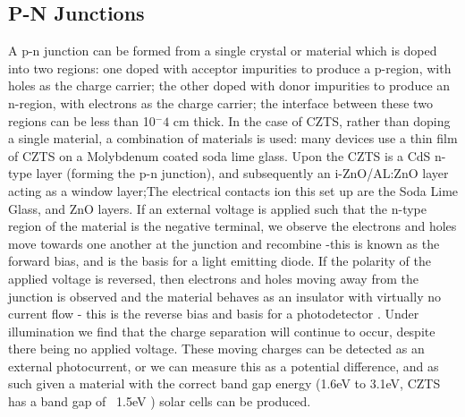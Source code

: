 \documentclass[11pt,a4paper,twoside]{article}
\begin{document}

\subsection{P-N Junctions}

A p-n junction can be formed from a single crystal or material which is doped into two regions: one doped with acceptor impurities to produce a p-region, with holes as the charge carrier; the other doped with donor impurities to produce an n-region, with electrons as the charge carrier; the interface between these two regions can be less than 10$^-4$ cm thick. \citep{Kittel2004} In the case of CZTS, rather than doping a single material, a combination of materials is used: many devices use a thin film of CZTS on a Molybdenum coated soda lime glass. Upon the CZTS is a CdS n-type layer (forming the p-n junction), and subsequently an i-ZnO/AL:ZnO layer acting as a window layer;The electrical contacts ion this set up are the Soda Lime Glass, and ZnO layers.\citep{Wang2011}
If an external voltage is applied such that the n-type region of the material is the negative terminal, we observe the electrons and holes move towards one another at the junction and recombine -this is  known as the forward bias, and is the basis for a light emitting diode.
If the polarity of the applied voltage is reversed, then electrons and holes moving away from the junction is observed and the material behaves as an insulator with virtually no current flow -  this is the reverse bias and basis for a photodetector \citep{Askeland2010}. Under illumination we find that the charge separation will continue to occur, despite there being no applied voltage. These moving charges can be detected as an external photocurrent, or we can measure this as a potential difference, and as such given a material with the correct band gap energy (1.6eV to 3.1eV, CZTS has a band gap of ~1.5eV \citep{JJAP.48.090202,Katagiri2001}) solar cells can be produced.

 

\end{document}
